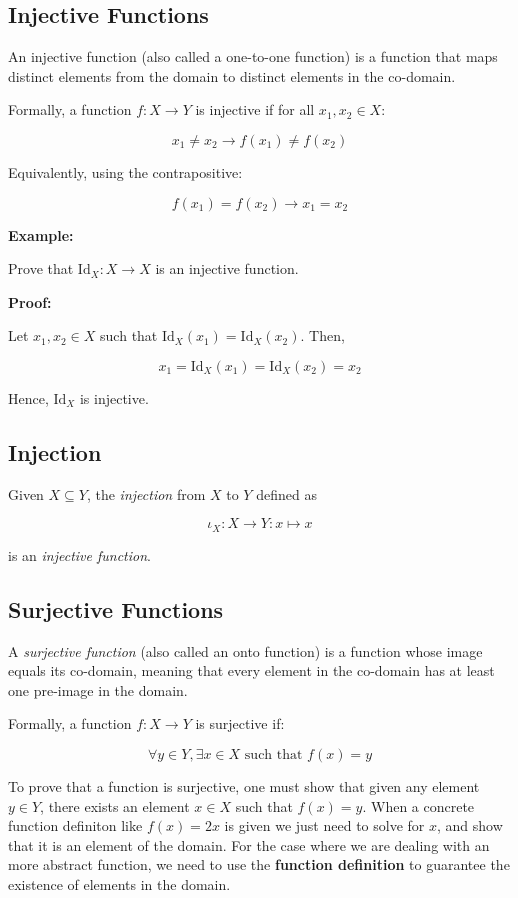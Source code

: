 \subsection{Injective Functions}

An injective function (also called a one-to-one function) is a
function that maps distinct elements from the domain to distinct elements in the co-domain.

Formally, a function \(f: X \to Y\) is injective if for all \(x_1, x_2 \in X\):

\[
	x_1 \neq x_2 \to f(x_1) \neq f(x_2)
\]

Equivalently, using the contrapositive:

\[
	f(x_1) = f(x_2) \to x_1 = x_2
\]

\textbf{Example:}

Prove that \(\mathrm{Id}_X: X \to X\) is an injective function.

\textbf{Proof:}

Let \(x_1, x_2 \in X\) such that \(\mathrm{Id}_X(x_1) = \mathrm{Id}_X(x_2)\). Then,

\[
	x_1 = \mathrm{Id}_X(x_1) = \mathrm{Id}_X(x_2) = x_2
\]

Hence, \(\mathrm{Id}_X\) is injective.

\QED

\subsection{Injection}

Given \(X \subseteq Y\), the \emph{injection} from \(X\) to \(Y\) defined as

\[
	\iota_{X}: X \to Y : x \mapsto x
\]

is an \emph{injective function}.

\subsection{Surjective Functions}

A \emph{surjective function} (also called an onto function) is a function whose image equals its co-domain,
meaning that every element in the co-domain has at least one pre-image in the domain.

Formally, a function \(f: X \to Y\) is surjective if:

\[
	\forall y \in Y, \exists x \in X \text{ such that } f(x) = y
\]

To prove that a function is surjective, one must show that given any element \(y \in Y\), there exists an element \(x \in X\) such that \(f(x) = y\). When
a concrete function definiton like \(f(x) = 2x\) is given we just need to solve for \(x\), and show that it is an element of the domain. For the case
where we are dealing with an more abstract function, we need to use the \textbf{function definition} to guarantee the existence of elements in the domain.

